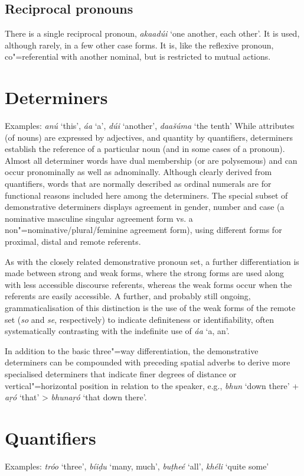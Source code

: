 \subsection{Reciprocal pronouns}
\label{subsec:3b-6-5}
There is a single reciprocal pronoun, \textit{akaadúi} `one another, each other'. It is used, although rarely, in a few other case forms. It is, like the reflexive pronoun, co"=referential with another nominal, but is restricted to mutual actions.


\section{Determiners}
\label{sec:3b-7}
Examples: \textit{anú} `this', \textit{áa} `a', \textit{dúi} `another', \textit{daašúma} `the tenth'
While attributes (of nouns) are expressed by adjectives, and quantity by quantifiers, determiners establish the reference of a particular noun (and in some cases of a pronoun). Almost all determiner words have dual membership (or are polysemous) and can occur pronominally as well as adnominally. Although clearly derived from quantifiers, words that are normally described as ordinal numerals are for functional reasons included here among the determiners. The special subset of demonstrative determiners displays agreement in gender, number and case (a nominative masculine singular agreement form vs. a non"=nominative/plural/feminine agreement form), using different forms for proximal, distal and remote referents.


As with the closely related demonstrative pronoun set, a further differentiation is made between strong and weak forms, where the strong forms are used along with less accessible discourse referents, whereas the weak forms occur when the referents are easily accessible. A further, and probably still ongoing, grammaticalisation of this distinction is the use of the weak forms of the remote set (\textit{so} and \textit{se}, respectively) to indicate definiteness or identifiability, often systematically contrasting with the indefinite use of \textit{áa} `a, an'.


In addition to the basic three"=way differentiation, the demonstrative determiners can be compounded with preceding spatial adverbs to derive more specialised determiners that  indicate finer degrees of distance or vertical"=horizontal position in relation to the speaker, e.g., \textit{bhun} `down there' + \textit{aṛó} `that' > \textit{bhunaṛó} `that down there'.


\section{Quantifiers}
\label{sec:3b-8}
Examples: \textit{tróo} `three', \textit{bíiḍu} `many, much', \textit{buṭheé} `all', \textit{khéli} `quite some'


